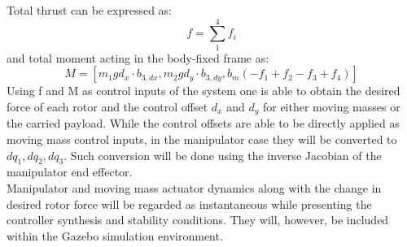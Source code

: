 Total thrust can be expressed as:
\begin{equation}
	f = \sum_{1}^{4}f_i
\end{equation}
and total moment acting in the body-fixed frame as:
\begin{equation}
	M = [m_{1}gd_x \cdot b_{3,dx} ,m_{2}gd_y \cdot b_{3,dy},b_m(-f_1 + f_2 - f_3 + f_4)]
\end{equation}
Using f and M as control inputs of the system one is able to obtain the desired force of each rotor and the control offset $d_x$ and $d_y$ for either moving masses or the carried payload. While the control offsets are able to be directly applied as moving mass control inputs, in the manipulator case they will be converted to $dq_1, dq_2, dq_3$. Such conversion will be done using the inverse Jacobian of the manipulator end effector.\\
Manipulator and moving mass actuator dynamics along with the change in desired rotor force will be regarded as instantaneous while presenting the controller synthesis and stability conditions. They will, however, be included within the Gazebo simulation environment.
